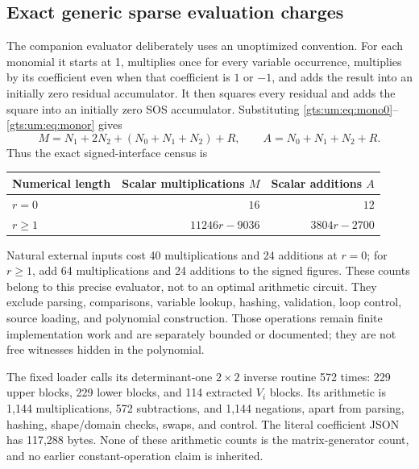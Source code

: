 \documentclass[11pt,letterpaper]{article}
\theoremstyle{definition}
\theoremstyle{remark}
\begin{document}
\subsection{Exact generic sparse evaluation charges}
The companion evaluator deliberately uses an unoptimized convention. For each monomial it starts at 1, multiplies once for every variable occurrence, multiplies by its coefficient even when that coefficient is $1$ or $-1$, and adds the result into an initially zero residual accumulator. It then squares every residual and adds the square into an initially zero SOS accumulator. Substituting \eqref{gts:um:eq:mono0}--\eqref{gts:um:eq:monor} gives
\[
 M=N_1+2N_2+(N_0+N_1+N_2)+R,\qquad
 A=N_0+N_1+N_2+R.
\]
Thus the exact signed-interface census is
\begin{center}
\begin{tabular}{lrr}\toprule
Numerical length & Scalar multiplications $M$ & Scalar additions $A$\\\midrule
$r=0$ & $16$ & $12$\\
$r\geq1$ & $11246r-9036$ & $3804r-2700$\\\bottomrule
\end{tabular}
\end{center}
Natural external inputs cost 40 multiplications and 24 additions at $r=0$; for $r\geq1$, add 64 multiplications and 24 additions to the signed figures. These counts belong to this precise evaluator, not to an optimal arithmetic circuit. They exclude parsing, comparisons, variable lookup, hashing, validation, loop control, source loading, and polynomial construction. Those operations remain finite implementation work and are separately bounded or documented; they are not free witnesses hidden in the polynomial.

The fixed loader calls its determinant-one $2\times2$ inverse routine 572 times: 229 upper blocks, 229 lower blocks, and 114 extracted $V_i$ blocks. Its arithmetic is 1,144 multiplications, 572 subtractions, and 1,144 negations, apart from parsing, hashing, shape/domain checks, swaps, and control. The literal coefficient JSON has 117,288 bytes. None of these arithmetic counts is the matrix-generator count, and no earlier constant-operation claim is inherited.
\end{document}
